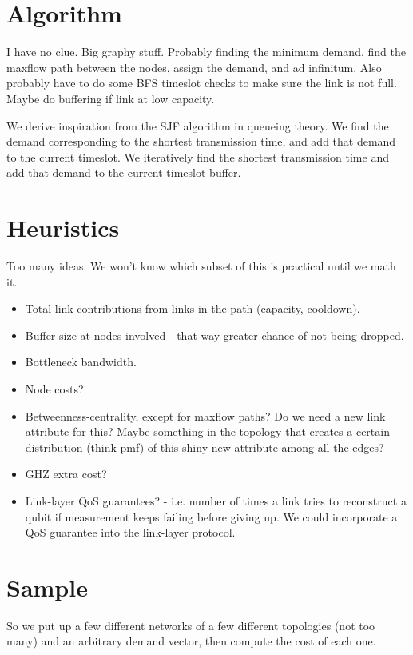 \documentclass{amsart}
\begin{document}
    \section{Algorithm}

    I have no clue. Big graphy stuff. Probably finding the minimum demand, find the maxflow path between the nodes, assign the demand, and ad infinitum. Also probably have to do some BFS timeslot checks to make sure the link is not full. Maybe do buffering if link at low capacity.

    We derive inspiration from the SJF algorithm in queueing theory. We find the demand corresponding to the shortest transmission time, and add that demand to the current timeslot. We iteratively find the shortest transmission time and add that demand to the current timeslot buffer. 

    \label{TODO:algorithm}

    \section{Heuristics}

    Too many ideas. We won't know which subset of this is practical until we math it.
    \begin{itemize}
        \item Total link contributions from links in the path (capacity, cooldown).
        \item Buffer size at nodes involved - that way greater chance of not being dropped.
        \item Bottleneck bandwidth.
        \item Node costs? 
        \item Betweenness-centrality, except for maxflow paths? Do we need a new link attribute for this? Maybe something in the topology that creates a certain distribution (think pmf) of this shiny new attribute among all the edges?
        \item GHZ extra cost?
        \item Link-layer QoS guarantees? - i.e. number of times a link tries to reconstruct a qubit if measurement keeps failing before giving up. We could incorporate a QoS guarantee into the link-layer protocol.
    \end{itemize}

    \section{Sample}

    So we put up a few different networks of a few different topologies (not too many) and an arbitrary demand vector, then compute the cost of each one. 
\end{document}
